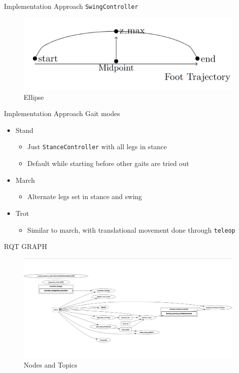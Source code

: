 \documentclass{beamer}
\begin{document}
\begin{frame}{Implementation Approach}
\texttt{SwingController}
\begin{figure}
    \centering
    \includegraphics[width=0.75\linewidth]{Presentation-4/images/ellipse.png}
    \caption{Ellipse}
\end{figure}
\end{frame}\normalfont

\begin{frame}{Implementation Approach}
Gait modes
\begin{itemize}
    \item Stand
    \begin{itemize}
        \item Just \texttt{StanceController} with all legs in stance
        \item Default while starting before other gaits are tried out
    \end{itemize}

    \item March
    \begin{itemize}
        \item Alternate legs set in stance and swing
    \end{itemize}

    \item Trot
    \begin{itemize}
        \item Similar to march, with translational movement done through \texttt{teleop}
    \end{itemize}
\end{itemize}
\end{frame}\normalfont

\begin{frame}{RQT GRAPH}
\begin{figure}
    \centering
    \includegraphics[width=1.0\linewidth]{Presentation-4/images/rqt-graph.png}
    \caption{Nodes and Topics}
    \label{fig:enter-label}
\end{figure}
\end{frame}\normalfont
\end{document}
